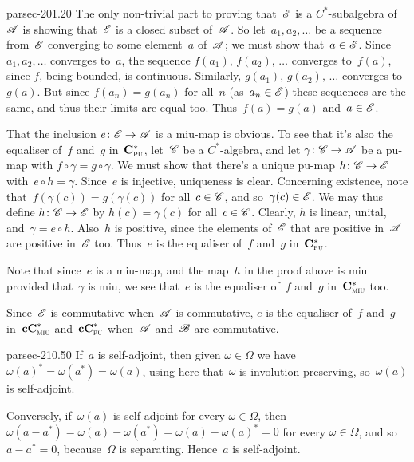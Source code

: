 \documentclass[b5page]{book}
\begin{document}
\begin{solution}{parsec-201.20}
The only non-trivial part to proving that~$\mathscr{E}$
is a $C^*$-subalgebra of~$\mathscr{A}$ is
showing that~$\mathscr{E}$ is a closed subset of~$\mathscr{A}$.
So let~$a_1,a_2,\dotsc$ be a sequence from~$\mathscr{E}$
converging to some element~$a$ of~$\mathscr{A}$;
we must show that~$a\in \mathscr{E}$.
Since~$a_1,a_2,\dotsc$ converges to~$a$,
    the sequence $f(a_1),\,f(a_2),\,\dotsc$
    converges to~$f(a)$,
since $f$, being bounded, is continuous.
    Similarly, $g(a_1),\,g(a_2),\,\dotsc$
    converges to~$g(a)$.
But since  $f(a_n)=g(a_n)$
    for all~$n$ (as~$a_n\in\mathscr{E}$)
these sequences
    are the same, and thus their
    limits are equal too.  Thus~$f(a)=g(a)$ and~$a\in\mathscr{E}$.

That the inclusion $e\colon \mathscr{E}\to\mathscr{A}$
is a miu-map is obvious. To see that it's also the equaliser
    of~$f$ and~$g$ in~$\mathbf{C}^*_{\text{\textsc{pu}}}$, let~$\mathscr{C}$ be a $C^*$-algebra,
and let $\gamma\colon \mathscr{C}\to\mathscr{A}$ be a pu-map with
$f\circ \gamma = g\circ \gamma$.
We must show that there's a unique pu-map $h\colon \mathscr{C}\to\mathscr{E}$
with~$e\circ h = \gamma$.
Since~$e$ is injective, uniqueness is clear.
Concerning existence, note
that~$f(\gamma(c))=g(\gamma(c))$
for all~$c\in\mathscr{C}$,
and so~$\gamma(c)\in\mathscr{E}$.
We may thus define $h\colon \mathscr{C}\to\mathscr{E}$ by
$h(c)=\gamma(c)$ for all~$c\in\mathscr{C}$.
Clearly, $h$ is linear, unital, and~$\gamma=e\circ h$.
Also~$h$ is positive, 
since the elements of~$\mathscr{E}$ that are positive in~$\mathscr{A}$
are positive in~$\mathscr{E}$ too.
    Thus~$e$ is the equaliser of~$f$ and~$g$ in~$\mathbf{C}^*_{\text{\textsc{pu}}}$.

Note that since~$e$ is a miu-map,
and the map~$h$ in the proof above is miu provided that~$\gamma$
is miu,
    we see that~$e$ is the equaliser of~$f$ and~$g$ in~$\mathbf{C}^*_{\text{\textsc{miu}}}$ too.

Since~$\mathscr{E}$ is commutative when~$\mathscr{A}$ is commutative,
    $e$ is the equaliser of~$f$ and~$g$ in~$\mathbf{cC}^*_{\text{\textsc{miu}}}$
    and~$\mathbf{cC}^*_{\text{\textsc{pu}}}$
    when~$\mathscr{A}$ and~$\mathscr{B}$ are commutative.
\end{solution}
\begin{solution}{parsec-210.50}
If~$a$ is self-adjoint,
then given $\omega\in\Omega$
we have~$\omega(a)^* = \omega(a^*)=\omega(a)$,
using here that~$\omega$ is involution preserving,
    so~$\omega(a)$ is self-adjoint.

    Conversely,
    if~$\omega(a)$ is self-adjoint for every $\omega\in\Omega$,
then $\omega(a-a^*)=\omega(a)-\omega(a^*)=
    \omega(a)-\omega(a)^*=0$ for every $\omega\in\Omega$,
    and so~$a-a^*=0$, because~$\Omega$ is separating.
    Hence~$a$ is self-adjoint.
\end{solution}
\end{document}
